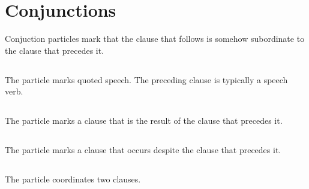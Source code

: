 \section{Conjunctions}
Conjuction particles mark that the clause that follows is somehow subordinate to the clause that precedes it.

\subsection{}
The particle  marks quoted speech. The preceding clause is typically a speech verb.

\subsection{}
The particle  marks a clause that is the result of the clause that precedes it.

\subsection{}
The particle  marks a clause that occurs despite the clause that precedes it.

\subsection{}
The particle  coordinates two clauses.